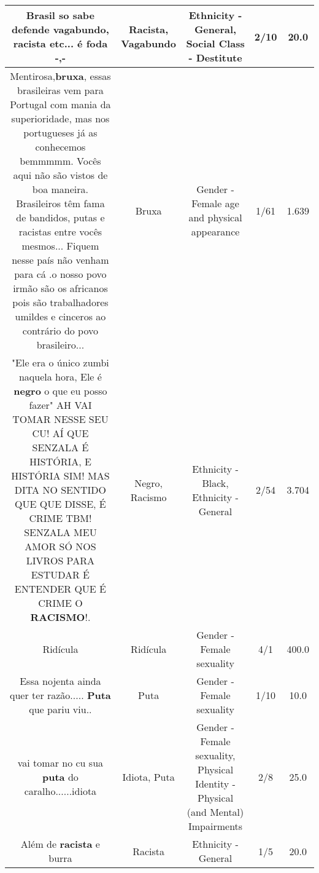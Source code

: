 \documentclass[11pt]{article}
\newlength\mylength
\begin{document}
\begin{center}
\begin{longtable}{|C{.65\mylength}|C{.30\mylength}|C{.12\mylength}|C{.12\mylength}|C{.12\mylength}|}
  \small Brasil so sabe defende \textbf{vagabundo}, \textbf{racista} etc... é foda -,-\normalsize   & Racista, Vagabundo & Ethnicity - General, Social Class - Destitute & 2/10 & 20.0 \\  \hline
  \small Mentirosa,\textbf{bruxa}, essas brasileiras vem para Portugal com mania da superioridade, mas nos portugueses já as conhecemos bemmmmm.  Vocês aqui não são vistos de boa maneira. Brasileiros têm fama de bandidos, putas e racistas entre vocês mesmos... Fiquem nesse país não venham para cá .o nosso povo irmão são os africanos pois são trabalhadores umildes e cinceros ao contrário do povo brasileiro...\normalsize   & Bruxa & Gender - Female age and physical appearance & 1/61 & 1.639 \\  \hline
  \small "Ele era o único zumbi naquela hora, Ele é \textbf{negro} o que eu posso fazer" AH VAI TOMAR NESSE SEU CU! AÍ QUE SENZALA É HISTÓRIA, E HISTÓRIA SIM! MAS DITA NO SENTIDO QUE QUE DISSE, É CRIME TBM! SENZALA MEU AMOR SÓ NOS LIVROS PARA ESTUDAR É ENTENDER QUE É CRIME O \textbf{RACISMO}!.\normalsize   & Negro, Racismo & Ethnicity - Black, Ethnicity - General & 2/54 & 3.704 \\  \hline
  \small Ridícula\normalsize   & Ridícula & Gender - Female sexuality & 4/1 & 400.0 \\  \hline
  \small Essa nojenta ainda quer ter razão..... \textbf{Puta} que pariu viu..\normalsize   & Puta & Gender - Female sexuality & 1/10 & 10.0 \\  \hline
  \small vai tomar no cu sua \textbf{puta} do caralho......idiota\normalsize   & Idiota, Puta & Gender - Female sexuality, Physical Identity - Physical (and Mental) Impairments & 2/8 & 25.0 \\  \hline
  \small Além de \textbf{racista} e burra\normalsize   & Racista & Ethnicity - General & 1/5 & 20.0 \\  \hline

\end{longtable}
\end{center}
\end{document}
